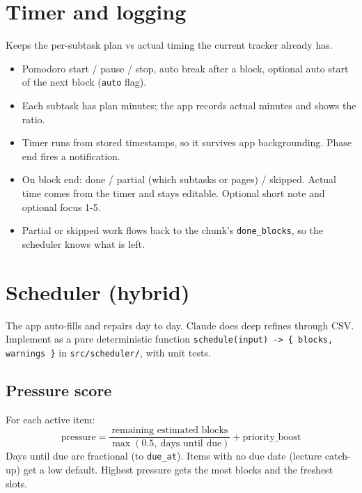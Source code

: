 \documentclass[11pt,a4paper]{article}
\newcommand{\code}[1]{\texttt{\small #1}}
\begin{document}
\section{Timer and logging}

Keeps the per-subtask plan vs actual timing the current tracker already has.

\begin{itemize}
  \item Pomodoro start / pause / stop, auto break after a block, optional auto start of the next block (\code{auto} flag).
  \item Each subtask has plan minutes; the app records actual minutes and shows the ratio.
  \item Timer runs from stored timestamps, so it survives app backgrounding. Phase end fires a notification.
  \item On block end: done / partial (which subtasks or pages) / skipped. Actual time comes from the timer and stays editable. Optional short note and optional focus 1-5.
  \item Partial or skipped work flows back to the chunk's \code{done\_blocks}, so the scheduler knows what is left.
\end{itemize}

\section{Scheduler (hybrid)}

The app auto-fills and repairs day to day. Claude does deep refines through CSV. Implement as a pure deterministic function \code{schedule(input) -> \{ blocks, warnings \}} in \code{src/scheduler/}, with unit tests.

\subsection*{Pressure score}
For each active item:
\[
  \text{pressure} = \frac{\text{remaining estimated blocks}}{\max(0.5,\ \text{days until due})} + \text{priority\_boost}
\]
Days until due are fractional (to \code{due\_at}). Items with no due date (lecture catch-up) get a low default. Highest pressure gets the most blocks and the freshest slots.
\end{document}
